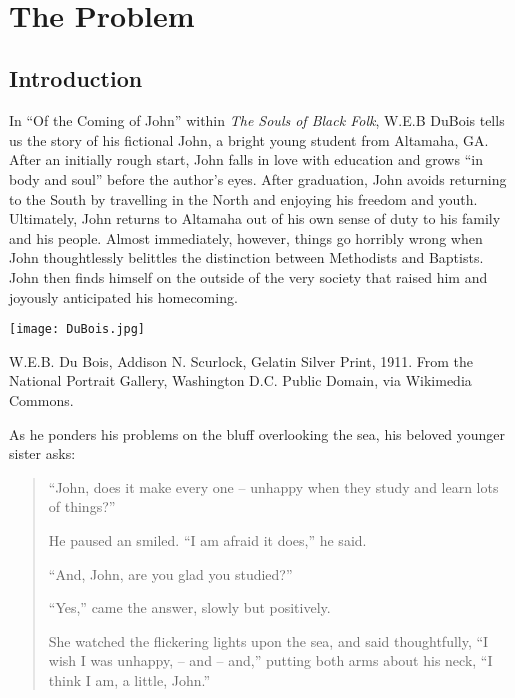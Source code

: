 \mainmatter\setcounter{page}{1}
    \fancyfoot[CE,CO]{\today} 


\part{The Problem}
\label{theproblem}

\chapter{Introduction}
\label{introduction}

In ``Of the Coming of John'' within \emph{The Souls of Black Folk}, W.E.B DuBois tells us the story of his fictional John, a bright young student from Altamaha, GA. After an initially rough start, John falls in love with education and grows ``in body and soul'' before the author's eyes. After graduation, John avoids returning to the South by travelling in the North and enjoying his freedom and youth. Ultimately, John returns to Altamaha out of his own sense of duty to his family and his people. Almost immediately, however, things go horribly wrong when John thoughtlessly belittles the distinction between Methodists and Baptists. John then finds himself on the outside of the very society that raised him and joyously anticipated his homecoming.\begin{marginfigure}\texttt{[image: DuBois.jpg]}\caption{W.E.B. Du Bois, Addison N. Scurlock, Gelatin Silver Print, 1911. From the National Portrait Gallery, Washington D.C. Public Domain, via Wikimedia Commons.}\label{fig:dubois}\end{marginfigure}

As he ponders his problems on the bluff overlooking the sea, his beloved younger sister asks:

\begin{quote}

``John, does it make every one -- unhappy when they study and learn lots of things?''

He paused an smiled. ``I am afraid it does,'' he said.

``And, John, are you glad you studied?''

``Yes,'' came the answer, slowly but positively.

She watched the flickering lights upon the sea, and said thoughtfully, ``I wish I was unhappy, -- and -- and,'' putting both arms about his neck, ``I think I am, a little, John.'' ~\citep[p. 149]{DuBois:1994ui}
\end{quote}

